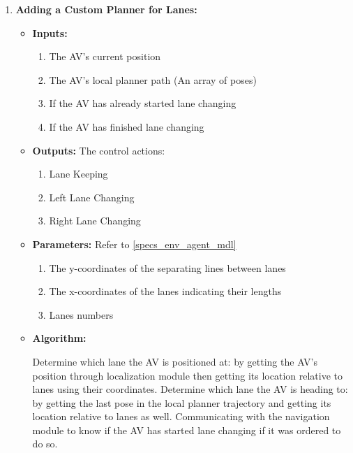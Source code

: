 \begin{enumerate}
\begin{figure}[hbtp]
    \caption{Communication Layer Update Algorithm}
    \label{fig:costmap_fig}
    \end{figure}
    
    
    \item \textbf{Adding a Custom Planner for Lanes:}
    \begin{itemize}
        \item \textbf{Inputs:} 
        \begin{enumerate}
            \item The AV's current position
            \item The AV's local planner path (An array of poses)
            \item If the AV has already started lane changing
            \item If the AV has finished lane changing
        \end{enumerate}
        \item \textbf{Outputs:} The control actions:
        \begin{enumerate}
            \item Lane Keeping
            \item Left Lane Changing
            \item Right Lane Changing
        \end{enumerate}
        \item \textbf{Parameters:} Refer to \ref{specs_env_agent_mdl}
        \begin{enumerate}
            \item The y-coordinates of the separating lines between lanes
            \item The x-coordinates of the lanes indicating their lengths 
            \item Lanes numbers
        \end{enumerate}
        \item \textbf{Algorithm:\\} 
        \begin{algorithm}[H]
\SetAlgoLined
Determine which lane the AV is positioned at: by getting the AV's position through localization module then getting its location relative to lanes using their coordinates.\;
Determine which lane the AV is heading to: by getting the last pose in the local planner trajectory and getting its location relative to lanes as well.\;
Communicating with the navigation module to know if the AV has started lane changing if it was ordered to do so.\;
\end{algorithm}
\end{itemize}
\end{enumerate}
